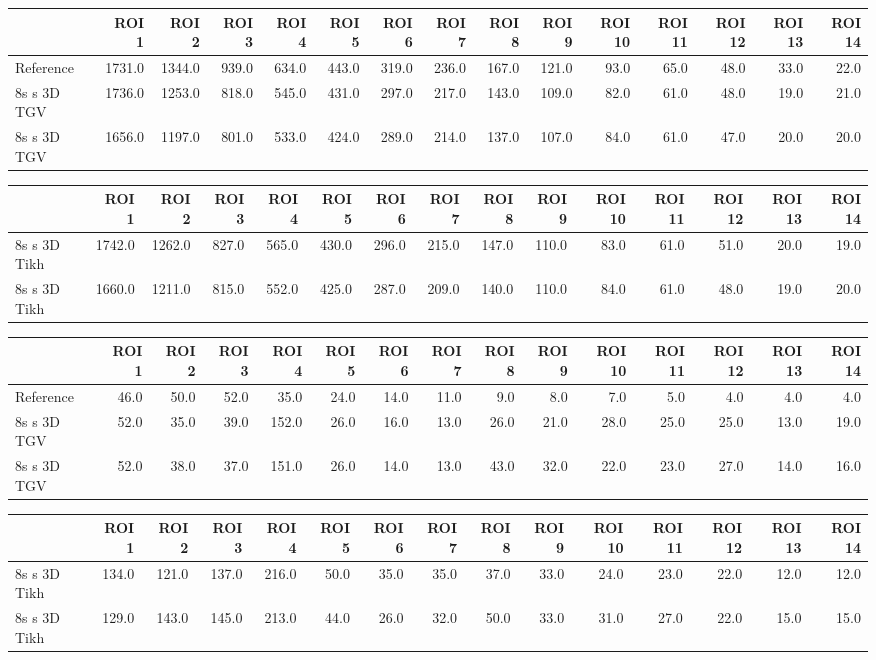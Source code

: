 \begin{tabular}{lrrrrrrrrrrrrrr}
\toprule
{} &   ROI 1 &   ROI 2 &  ROI 3 &  ROI 4 &  ROI 5 &  ROI 6 &  ROI 7 &  ROI 8 &  ROI 9 &  ROI 10 &  ROI 11 &  ROI 12 &  ROI 13 &  ROI 14 \\
\midrule
Reference   &  1731.0 &  1344.0 &  939.0 &  634.0 &  443.0 &  319.0 &  236.0 &  167.0 &  121.0 &    93.0 &    65.0 &    48.0 &    33.0 &    22.0 \\
8s s 3D TGV &  1736.0 &  1253.0 &  818.0 &  545.0 &  431.0 &  297.0 &  217.0 &  143.0 &  109.0 &    82.0 &    61.0 &    48.0 &    19.0 &    21.0 \\
8s s 3D TGV &  1656.0 &  1197.0 &  801.0 &  533.0 &  424.0 &  289.0 &  214.0 &  137.0 &  107.0 &    84.0 &    61.0 &    47.0 &    20.0 &    20.0 \\
\bottomrule
\end{tabular}
\begin{tabular}{lrrrrrrrrrrrrrr}
\toprule
{} &   ROI 1 &   ROI 2 &  ROI 3 &  ROI 4 &  ROI 5 &  ROI 6 &  ROI 7 &  ROI 8 &  ROI 9 &  ROI 10 &  ROI 11 &  ROI 12 &  ROI 13 &  ROI 14 \\
\midrule
8s s 3D Tikh &  1742.0 &  1262.0 &  827.0 &  565.0 &  430.0 &  296.0 &  215.0 &  147.0 &  110.0 &    83.0 &    61.0 &    51.0 &    20.0 &    19.0 \\
8s s 3D Tikh &  1660.0 &  1211.0 &  815.0 &  552.0 &  425.0 &  287.0 &  209.0 &  140.0 &  110.0 &    84.0 &    61.0 &    48.0 &    19.0 &    20.0 \\
\bottomrule
\end{tabular}
\begin{tabular}{lrrrrrrrrrrrrrr}
\toprule
{} &  ROI 1 &  ROI 2 &  ROI 3 &  ROI 4 &  ROI 5 &  ROI 6 &  ROI 7 &  ROI 8 &  ROI 9 &  ROI 10 &  ROI 11 &  ROI 12 &  ROI 13 &  ROI 14 \\
\midrule
Reference   &   46.0 &   50.0 &   52.0 &   35.0 &   24.0 &   14.0 &   11.0 &    9.0 &    8.0 &     7.0 &     5.0 &     4.0 &     4.0 &     4.0 \\
8s s 3D TGV &   52.0 &   35.0 &   39.0 &  152.0 &   26.0 &   16.0 &   13.0 &   26.0 &   21.0 &    28.0 &    25.0 &    25.0 &    13.0 &    19.0 \\
8s s 3D TGV &   52.0 &   38.0 &   37.0 &  151.0 &   26.0 &   14.0 &   13.0 &   43.0 &   32.0 &    22.0 &    23.0 &    27.0 &    14.0 &    16.0 \\
\bottomrule
\end{tabular}
\begin{tabular}{lrrrrrrrrrrrrrr}
\toprule
{} &  ROI 1 &  ROI 2 &  ROI 3 &  ROI 4 &  ROI 5 &  ROI 6 &  ROI 7 &  ROI 8 &  ROI 9 &  ROI 10 &  ROI 11 &  ROI 12 &  ROI 13 &  ROI 14 \\
\midrule
8s s 3D Tikh &  134.0 &  121.0 &  137.0 &  216.0 &   50.0 &   35.0 &   35.0 &   37.0 &   33.0 &    24.0 &    23.0 &    22.0 &    12.0 &    12.0 \\
8s s 3D Tikh &  129.0 &  143.0 &  145.0 &  213.0 &   44.0 &   26.0 &   32.0 &   50.0 &   33.0 &    31.0 &    27.0 &    22.0 &    15.0 &    15.0 \\
\bottomrule
\end{tabular}
